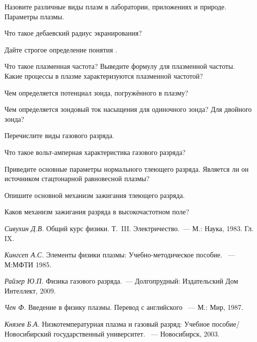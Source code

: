 \begin{lab:questions}

\item Назовите различные виды плазм в лаборатории, приложениях и природе. Параметры плазмы.

\item Что такое дебаевский радиус экранирования?

\item Дайте строгое определение понятия .

\item Что такое плазменная частота? Выведите формулу для плазменной частоты. Какие процессы в плазме характеризуются плазменной частотой?

\item Чем определяется потенциал зонда, погружённого в плазму?

\item Чем определяется зондовый ток насыщения для одиночного зонда? Для двойного зонда?

\item Перечислите виды газового разряда.

\item Что такое вольт-амперная характеристика газового разряда?

\item Приведите основные параметры нормального тлеющего разряда. Является ли он источником стацтонарной равновесной плазмы?

\item Опишите основной механизм зажигания тлеющего разряда.

\item Каков механизм зажигания разряда в высокочастотном поле?

\end{lab:questions}


\begin{lab:literature}

\item \emph{Сивухин Д.В.} Общий курс физики. Т.~III. Электричество.~--- М.: Наука, 1983. Гл. IX.

\item \emph{Кингсеп А.С.} Элементы физики плазмы: Учебно-методическое пособие. ~--- М:МФТИ 1985.

\item \emph{Райзер Ю.П.} Физика газового разряда.~--- Долгопрудный: Издательский Дом Интеллект, 2009.

\item \emph{Чен Ф.} Введение в физику плазмы. Перевод с английского ~--- М.: Мир, 1987.

\item \emph{Князев Б.А.} Низкотемпературная плазма и газовый разряд: Учебное пособие/ Новосибирский государственный университет. ~--- Новосибирск, 2003.
\end{lab:literature}